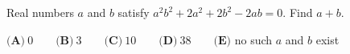 Real numbers $a$ and $b$ satisfy $a^2b^2+2a^2+2b^2-2ab=0$. Find $a+b$.

$\textbf{(A)}\ 0\qquad\textbf{(B)}\ 3\qquad\textbf{(C)}\ 10\qquad\textbf{(D)}\ 38\qquad\textbf{(E)}$ no such $a$ and $b$ exist
